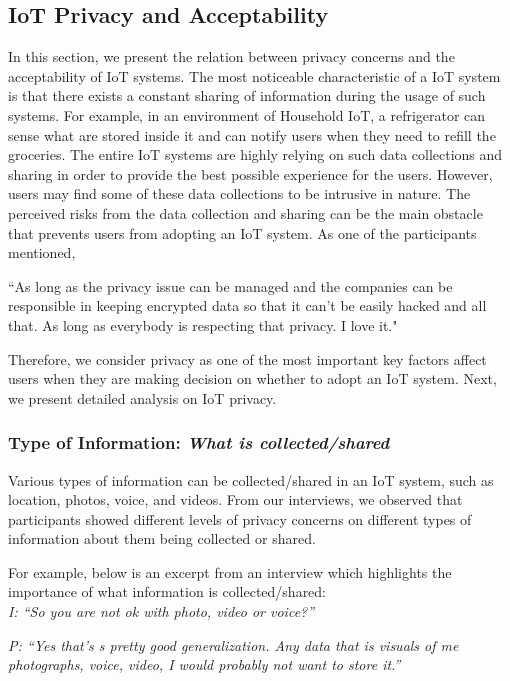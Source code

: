 \subsection{IoT Privacy and Acceptability}
In this section, we present the relation between privacy concerns and the acceptability of IoT systems. The most noticeable characteristic of a IoT system is that there exists a constant sharing of information during the usage of such systems. For example, in an environment of Household IoT, a refrigerator can sense what are stored inside it and can notify users when they need to refill the groceries. The entire IoT systems are highly relying on such data collections and sharing in order to provide the best possible experience for the users. However, users may find some of these data collections to be intrusive in nature. The perceived risks from the data collection and sharing can be the main obstacle that prevents users from adopting an IoT system. As one of the participants mentioned, 

``As long as the privacy issue can be managed and the companies can be responsible in keeping encrypted data so that it can't be easily hacked and all that. As long as everybody is respecting that privacy. I love it." 

Therefore, we consider privacy as one of the most important key factors affect users when they are making decision on whether to adopt an IoT system. Next, we present detailed analysis on IoT privacy.

\subsubsection{Type of Information: \textit{What is collected/shared}}
Various types of information can be collected/shared in an IoT system, such as location, photos, voice, and videos. From our interviews, we observed that participants showed different levels of privacy concerns on different types of information about them being collected or shared. 

For example,
below is an excerpt from an interview which highlights the importance of what information is collected/shared:\\

\textit{I: ``So you are not ok with photo, video or voice?''\\}

\textit{P: ``Yes that's s pretty good generalization. Any data that is visuals of me photographs, voice, video, I would probably not want to store it.''\\}


